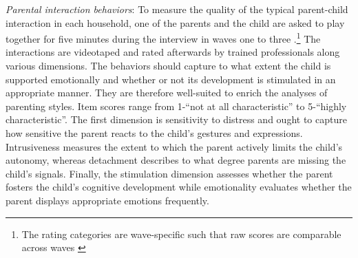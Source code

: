 \textit{Parental interaction behaviors}: To measure the quality of the typical parent-child interaction in each household, one of the parents and the child are asked to play together for five minutes during the interview in waves one to three \parencite[for a more detailed description, see]{linbergQualityParentChildInteractions2019}.\footnote{
The rating categories are wave-specific such that raw scores are comparable across waves \parencite[p. 6]{nepsnationaleducationalpanelstudybamberggermanyNEPSStartingCohort2021}
} The interactions are videotaped and rated afterwards by trained professionals along various dimensions. The behaviors should capture to what extent the child is supported emotionally and whether or not its development is stimulated in an appropriate manner. They are therefore well-suited to enrich the analyses of parenting styles. Item scores range from 1-``not at all characteristic'' to 5-``highly characteristic''. The first dimension is sensitivity to distress and ought to capture how sensitive the parent reacts to the child's gestures and expressions. Intrusiveness measures the extent to which the parent actively limits the child's autonomy, whereas detachment describes to what degree parents are missing the child's signals. Finally, the stimulation dimension assesses whether the parent fosters the child's cognitive development while emotionality evaluates whether the parent displays appropriate emotions frequently.

